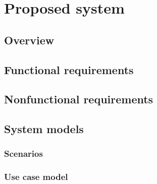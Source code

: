 \documentclass[a4paper,12pt]{article}
\begin{document}
 \section{Proposed system}

 \subsection{Overview}

 \subsection{Functional requirements}

 \subsection{Nonfunctional requirements}

 \subsection{System models}

 \subsubsection{Scenarios}

 \subsubsection{Use case model}
\end{document}
